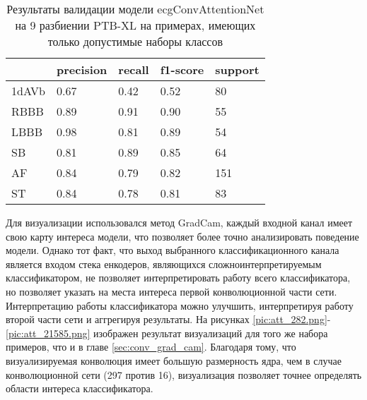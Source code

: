 \documentclass[oneside,final,14pt]{extreport}
\begin{document}
\begin{table}[H]
\caption{Результаты валидации модели ecgConvAttentionNet на  9 разбиении PTB-XL на примерах, имеющих только допустимые наборы классов}

\label{tab:ecg_conv_attention_res}
\begin{tabularx}{\textwidth}{|X|X|X|X|X|} %
\hline 
&precision & recall &  f1-score  &support \\ \hline
 1dAVb   &    0.67    &  0.42   &   0.52   &     80 \\ \hline
    RBBB   &    0.89  &    0.91  &    0.90   &     55 \\ \hline
    LBBB   &    0.98   &   0.81  &    0.89   &     54 \\ \hline
      SB   &   0.81   &   0.89   &   0.85    &    64 \\ \hline
      AF    &   0.84   &   0.79  &    0.82    &   151\\ \hline 
      ST    &   0.84    &  0.78   &   0.81    &    83 \\ \hline
\end{tabularx}
\end{table}
\newpage
Для визуализации использовался метод GradCam, каждый входной канал имеет свою карту интереса модели, что позволяет более точно анализировать поведение модели. Однако тот факт, что выход выбранного классификационного канала является входом стека енкодеров, являющихся сложноинтерпретируемым классификатором, не позволяет интерпретировать работу всего классификатора, но позволяет указать на места интереса первой конволюционной части сети. Интерпретацию работы классификатора можно улучшить, интерпретируя работу второй части сети и аггрегируя результаты. На рисунках \ref{pic:att_282.png}- \ref{pic:att_21585.png} изображен результат визуализаций для того же набора примеров, что и в главе   \ref{sec:conv_grad_cam}. Благодаря тому, что визуализируемая конволюция имеет большую размерность ядра, чем в случае конволюционной сети (297 против 16), визуализация позволяет точнее определять области интереса классификатора. 
\end{document}
